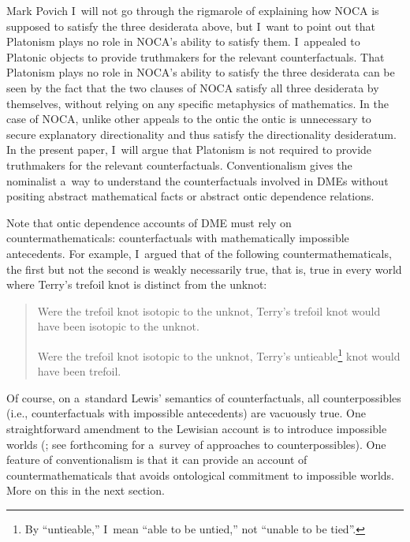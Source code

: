 \begin{artengenv}{Mark Povich}
I~will not go through the rigmarole of explaining how NOCA is supposed to satisfy the three desiderata above, but I~want to point out that Platonism plays no role in NOCA's ability to satisfy them. I~appealed to Platonic objects to provide truthmakers for the relevant counterfactuals. That Platonism plays no role in NOCA's ability to satisfy the three desiderata can be seen by the fact that the two clauses of NOCA satisfy all three desiderata by themselves, without relying on any specific metaphysics of mathematics. In the case of NOCA, unlike other appeals to the ontic
\parencites[e.g., to causation in the case of Bromberger's flagpole;][]{salmon_scientific_1984}{salmon_four_1989}
 the ontic is unnecessary to secure explanatory directionality and thus satisfy the directionality desideratum. In the present paper, I~will argue that Platonism is not required to provide truthmakers for the relevant counterfactuals. Conventionalism gives the nominalist a~way to understand the counterfactuals involved in DMEs without positing abstract mathematical facts or abstract ontic dependence relations.

Note that ontic dependence accounts of DME must rely on countermathematicals: counterfactuals with mathematically impossible antecedents. For example, I~argued that of the following countermathematicals, the first but not the second is weakly necessarily true, that is, true in every world where Terry's trefoil knot is distinct from the unknot:

\begin{quote}
Were the trefoil knot isotopic to the unknot, Terry's trefoil knot would have been isotopic to the unknot.

Were the trefoil knot isotopic to the unknot, Terry's untieable\footnote{By ``untieable,'' I~mean ``able to be untied,'' not ``unable to be tied''.} knot would have been trefoil.
\end{quote}
Of course, on a~standard Lewis'
\parencite*[][]{lewis_counterfactuals_1973} %
 semantics of counterfactuals, all counterpossibles (i.e., counterfactuals with impossible antecedents) are vacuously true. One straightforward amendment to the Lewisian account is to introduce impossible worlds 
(\cite[][]{brogaard_remarks_2013}; see \citeauthor{kocurek_counterpossibles_2021} forthcoming for a~survey of approaches to counterpossibles). %
 One feature of conventionalism is that it can provide an account of countermathematicals that avoids ontological commitment to impossible worlds. More on this in the next section.


\end{artengenv}
